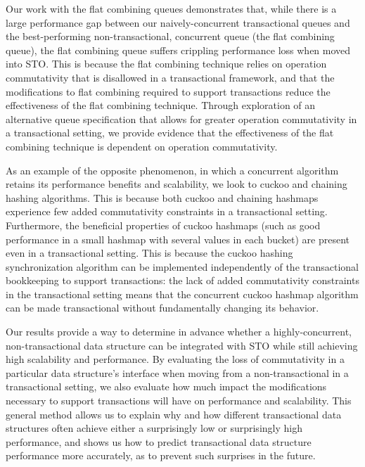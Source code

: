 Our work with the flat combining queues demonstrates that, while there is a large performance gap between our naively-concurrent transactional queues and the best-performing non-transactional, concurrent queue (the flat combining queue), the flat combining queue suffers crippling performance loss when moved into STO. This is because the flat combining technique relies on operation commutativity that is disallowed in a transactional framework, and that the modifications to flat combining required to support transactions reduce the effectiveness of the flat combining technique. Through exploration of an alternative queue specification that allows for greater operation commutativity in a transactional setting, we provide evidence that the effectiveness of the flat combining technique is dependent on operation commutativity.

As an example of the opposite phenomenon, in which a concurrent algorithm retains its performance benefits and scalability, we look to cuckoo and chaining hashing algorithms. This is because both cuckoo and chaining hashmaps experience few added commutativity constraints in a transactional setting.
Furthermore, the beneficial properties of cuckoo hashmaps (such as good performance in a small hashmap with several values in each bucket) are present even in a transactional setting. This is because the cuckoo hashing synchronization algorithm can be implemented independently of the transactional bookkeeping to support transactions: the lack of added commutativity constraints in the transactional setting means that the concurrent cuckoo hashmap algorithm can be made transactional without fundamentally changing its behavior.

Our results provide a way to determine in advance whether a highly-concurrent, non-transactional data structure can be integrated with STO while still achieving high scalability and performance. By evaluating the loss of commutativity in a particular data structure's interface when moving from a non-transactional in a transactional setting, we also evaluate how much impact the modifications necessary to support transactions will have on performance and scalability. This general method allows us to explain why and how different transactional data structures often achieve either a surprisingly low or surprisingly high performance, and shows us how to predict transactional data structure performance more accurately, as to prevent such surprises in the future.

